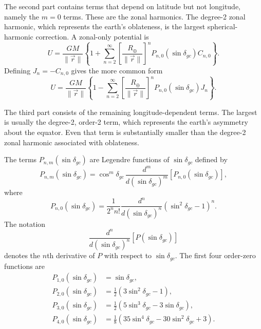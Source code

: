 The second part contains terms that depend on latitude but not longitude, namely the
$m=0$ terms. These are the zonal harmonics. The degree-2 zonal harmonic, which
represents the earth's oblateness, is the largest spherical-harmonic correction. A
zonal-only potential is
\begin{equation}
  U=\frac{GM}{\lVert\vec r\rVert}
  \left\{1+\sum_{n=2}^{\infty}
    \left[\frac{R_{\oplus}}{\lVert\vec r\rVert}\right]^n
    P_{n,0}(\sin\delta_{gc})C_{n,0}\right\}.
  \label{eq:zonal-geopotential-c-coefficients}
\end{equation}
Defining $J_n=-C_{n,0}$ gives the more common form
\begin{equation}
  U=\frac{GM}{\lVert\vec r\rVert}
  \left\{1-\sum_{n=2}^{\infty}
    \left[\frac{R_{\oplus}}{\lVert\vec r\rVert}\right]^n
    P_{n,0}(\sin\delta_{gc})J_n\right\}.
  \label{eq:zonal-geopotential-j-coefficients}
\end{equation}

The third part consists of the remaining longitude-dependent terms. The largest is
usually the degree-2, order-2 term, which represents the earth's asymmetry about the
equator. Even that term is substantially smaller than the degree-2 zonal harmonic
associated with oblateness.


The terms $P_{n,m}(\sin\delta_{gc})$ are Legendre functions of
$\sin\delta_{gc}$ defined by
\begin{equation}
  P_{n,m}(\sin\delta_{gc})
  =\cos^m\delta_{gc}\,
   \frac{d^m}{d(\sin\delta_{gc})^m}
   \left[P_{n,0}(\sin\delta_{gc})\right],
  \label{eq:associated-legendre-definition}
\end{equation}
where
\begin{equation}
  P_{n,0}(\sin\delta_{gc})
  =\frac{1}{2^n n!}
   \frac{d^n}{d(\sin\delta_{gc})^n}
   \left(\sin^2\delta_{gc}-1\right)^n.
  \label{eq:legendre-order-zero-definition}
\end{equation}
The notation
\begin{equation}
  \frac{d^n}{d(\sin\delta_{gc})^n}
  \left[P(\sin\delta_{gc})\right]
  \label{eq:legendre-derivative-notation}
\end{equation}
denotes the $n$th derivative of $P$ with respect to $\sin\delta_{gc}$. The first
four order-zero functions are
\begin{equation}
  \begin{aligned}
  P_{1,0}(\sin\delta_{gc})&=\sin\delta_{gc},\\
  P_{2,0}(\sin\delta_{gc})&=\tfrac12
    \left(3\sin^2\delta_{gc}-1\right),\\
  P_{3,0}(\sin\delta_{gc})&=\tfrac12
    \left(5\sin^3\delta_{gc}-3\sin\delta_{gc}\right),\\
  P_{4,0}(\sin\delta_{gc})&=\tfrac18
    \left(35\sin^4\delta_{gc}-30\sin^2\delta_{gc}+3\right).
  \end{aligned}
  \label{eq:first-four-legendre-functions}
\end{equation}

